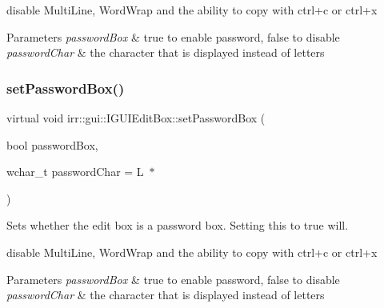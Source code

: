 disable Multi\+Line, Word\+Wrap and the ability to copy with ctrl+c or ctrl+x 
\begin{DoxyParams}{Parameters}
{\em password\+Box} & true to enable password, false to disable \\
\hline
{\em password\+Char} & the character that is displayed instead of letters \\
\hline
\end{DoxyParams}
\mbox{\label{classirr_1_1gui_1_1IGUIEditBox_a755baeca9941267fe11b0c0598b772bf}} 
\subsubsection{\texorpdfstring{set\+Password\+Box()}{setPasswordBox()}\hspace{0.1cm}{\footnotesize\ttfamily [2/2]}}
{\footnotesize\ttfamily virtual void irr\+::gui\+::\+I\+G\+U\+I\+Edit\+Box\+::set\+Password\+Box (\begin{DoxyParamCaption}\item[{bool}]{password\+Box,  }\item[{wchar\+\_\+t}]{password\+Char = {\ttfamily L\textquotesingle{}~$\ast$\textquotesingle{}} }\end{DoxyParamCaption})\hspace{0.3cm}{\ttfamily [pure virtual]}}



Sets whether the edit box is a password box. Setting this to true will. 

disable Multi\+Line, Word\+Wrap and the ability to copy with ctrl+c or ctrl+x 
\begin{DoxyParams}{Parameters}
{\em password\+Box} & true to enable password, false to disable \\
\hline
{\em password\+Char} & the character that is displayed instead of letters \\
\hline
\end{DoxyParams}
\mbox{\label{classirr_1_1gui_1_1IGUIEditBox_ab1e2379940983f4ff874f5143f6d7244}} 

